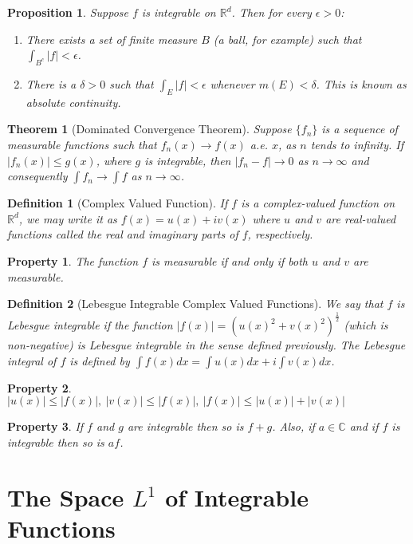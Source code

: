 \documentclass{report}
\theoremstyle{upthm}
\newtheorem{thm}{Theorem}
\newtheorem{defn}{Definition}
\newtheorem{prop}{Proposition}
\newtheorem{property}{Property}
\newcommand{\reals}{\mathbb{R}}
\newcommand{\mb}[1]{{\mathbb{#1}}}
\newcommand{\set}[1]{\big\lbrace #1 \big\rbrace}
\begin{document}
\begin{prop}
	Suppose $f$ is integrable on $\reals^d$. Then for every $\epsilon > 0$:
	\begin{enumerate}
		\item  There exists a set of finite measure $B$ (a ball, for example) such
		that $\int_{B^c} |f| < \epsilon$.
		\item There is a $\delta > 0$ such that $\int_E |f| < \epsilon$ whenever $m(E) < \delta$. This is known as absolute continuity.
	\end{enumerate}
\end{prop}

\begin{thm}[Dominated Convergence Theorem]
	Suppose $\set{f_n}$ is a sequence of measurable functions such that $f_n(x) \rightarrow f(x)$ a.e. $x$, as $n$ tends to infinity. If $|f_n(x)|  \leq g(x)$, where $g$ is integrable, then $ |f_n - f |  \rightarrow 0$ as  $n \rightarrow \infty$ and consequently $ \int f_n \rightarrow \int	f$ as $n \rightarrow \infty$.
\end{thm}

\begin{defn}[Complex Valued Function]
	If $f$ is a complex-valued function on $\reals^d$, we may write it as $f(x) = u(x) + i v(x)$ where $u$ and $v$ are real-valued functions called the real and imaginary	parts of $f$, respectively.
\end{defn}
\begin{property}
	The function $f$ is measurable if and only if both $u$ and $v$ are measurable.
\end{property}

\begin{defn}[Lebesgue Integrable Complex Valued Functions]
	We say that $f$ is Lebesgue integrable if the function $|f(x)| = (u(x)^2 + v(x)^2)^{\frac{1}{2}}$ (which is non-negative) is Lebesgue integrable in the sense defined previously. The Lebesgue integral of $f$ is defined by $\int f(x) dx = \int u(x) dx + i \int v(x) dx$.
\end{defn}
\begin{property}
	$|u(x)| \leq |f(x)|,\ |v(x)| \leq |f(x)|,\ |f(x)| \leq |u(x)| + |v(x)|$
\end{property}
\begin{property}
	If $f$ and $g$ are integrable then so is $f + g$. Also, if $a \in \mb{C}$ and if $f$ is integrable then so is $af$.
\end{property}

\section{The Space $L^1$ of Integrable Functions}
\end{document}
